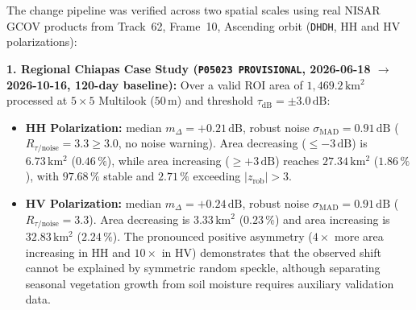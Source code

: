 \documentclass[11pt,a4paper]{article}
\newcommand{\unit}[1]{\mathrm{#1}}
\begin{document}
\begin{ejemplo}
The change pipeline was verified across two spatial scales using real NISAR GCOV products from Track~62, Frame~10, Ascending orbit (\texttt{DHDH}, HH and HV polarizations):

\medskip
\noindent\textbf{1. Regional Chiapas Case Study (\texttt{P05023 PROVISIONAL}, 2026-06-18 $\to$ 2026-10-16, 120-day baseline):}
Over a valid ROI area of $1,469.2\,\unit{km^2}$ processed at $5\times 5$ Multilook ($50\,\unit{m}$) and threshold $\tau_{\mathrm{dB}} = \pm 3.0\,\unit{dB}$:
\begin{itemize}
  \item \textbf{HH Polarization:} median $m_{\Delta} = +0.21\,\unit{dB}$, robust noise $\sigma_{\mathrm{MAD}} = 0.91\,\unit{dB}$ ($R_{\tau/\text{noise}} = 3.3 \ge 3.0$, no noise warning). Area decreasing ($\le -3\,\unit{dB}$) is $6.73\,\unit{km^2}$ ($0.46\,\text{\%}$), while area increasing ($\ge +3\,\unit{dB}$) reaches $27.34\,\unit{km^2}$ ($1.86\,\text{\%}$), with $97.68\,\text{\%}$ stable and $2.71\,\text{\%}$ exceeding $|z_{\mathrm{rob}}| > 3$.
  \item \textbf{HV Polarization:} median $m_{\Delta} = +0.24\,\unit{dB}$, robust noise $\sigma_{\mathrm{MAD}} = 0.91\,\unit{dB}$ ($R_{\tau/\text{noise}} = 3.3$). Area decreasing is $3.33\,\unit{km^2}$ ($0.23\,\text{\%}$) and area increasing is $32.83\,\unit{km^2}$ ($2.24\,\text{\%}$). The pronounced positive asymmetry ($4\times$ more area increasing in HH and $10\times$ in HV) demonstrates that the observed shift cannot be explained by symmetric random speckle, although separating seasonal vegetation growth from soil moisture requires auxiliary validation data.
\end{itemize}


\end{ejemplo}
\end{document}
